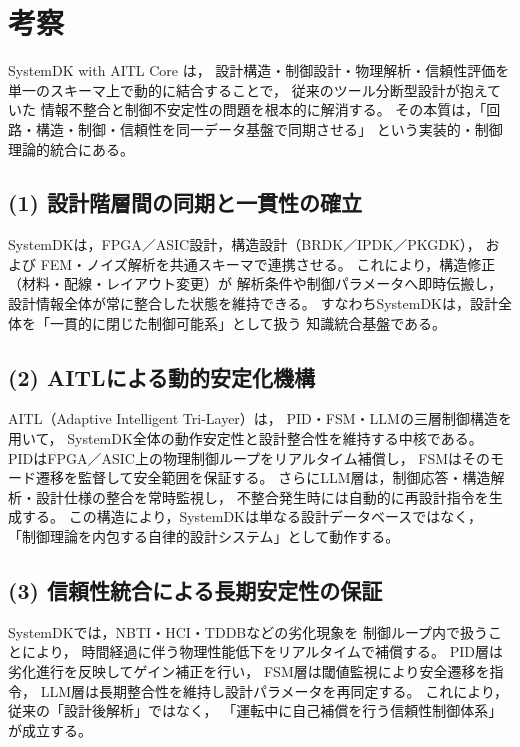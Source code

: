 \section{考察}

SystemDK with AITL Core は，
設計構造・制御設計・物理解析・信頼性評価を
単一のスキーマ上で動的に結合することで，
従来のツール分断型設計が抱えていた
情報不整合と制御不安定性の問題を根本的に解消する。
その本質は，「回路・構造・制御・信頼性を同一データ基盤で同期させる」
という実装的・制御理論的統合にある。

\subsection{(1) 設計階層間の同期と一貫性の確立}
SystemDKは，FPGA／ASIC設計，構造設計（BRDK／IPDK／PKGDK），
および FEM・ノイズ解析を共通スキーマで連携させる。
これにより，構造修正（材料・配線・レイアウト変更）が
解析条件や制御パラメータへ即時伝搬し，
設計情報全体が常に整合した状態を維持できる。
すなわちSystemDKは，設計全体を「一貫的に閉じた制御可能系」として扱う
知識統合基盤である。

\subsection{(2) AITLによる動的安定化機構}
AITL（Adaptive Intelligent Tri-Layer）は，
PID・FSM・LLMの三層制御構造を用いて，
SystemDK全体の動作安定性と設計整合性を維持する中核である。
PIDはFPGA／ASIC上の物理制御ループをリアルタイム補償し，
FSMはそのモード遷移を監督して安全範囲を保証する。
さらにLLM層は，制御応答・構造解析・設計仕様の整合を常時監視し，
不整合発生時には自動的に再設計指令を生成する。
この構造により，SystemDKは単なる設計データベースではなく，
「制御理論を内包する自律的設計システム」として動作する。

\subsection{(3) 信頼性統合による長期安定性の保証}
SystemDKでは，NBTI・HCI・TDDBなどの劣化現象を
制御ループ内で扱うことにより，
時間経過に伴う物理性能低下をリアルタイムで補償する。
PID層は劣化進行を反映してゲイン補正を行い，
FSM層は閾値監視により安全遷移を指令，
LLM層は長期整合性を維持し設計パラメータを再同定する。
これにより，従来の「設計後解析」ではなく，
「運転中に自己補償を行う信頼性制御体系」が成立する。

